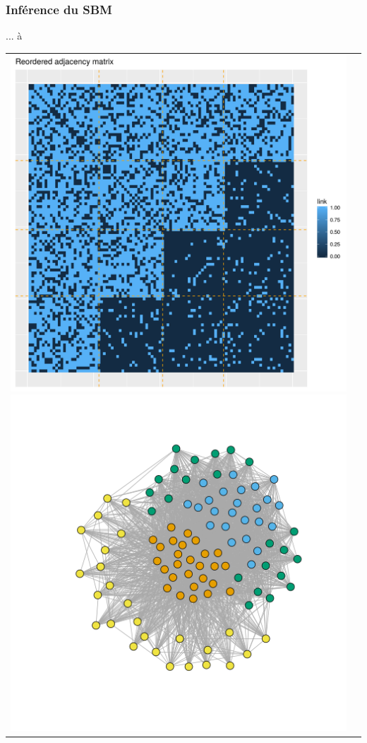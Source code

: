 \documentclass[nopagenumber,9pt]{beamer}
\begin{document}
\begin{frame}\frametitle{Inférence du SBM} 

... à 

\centering
\begin{tabular}{cc}
\includegraphics[scale=.2]{plots/sbm/Nested_reordered_adja_with_groups.png}
\includegraphics[scale=.2]{plots/sbm/Nested_graphe_with_colors.png}
\end{tabular}


\end{frame}
\end{document}
